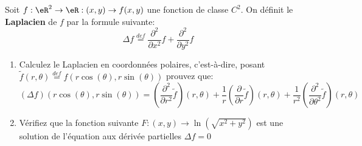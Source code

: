 
\begin{exercice}\label{exo0061}

Soit $f:\eR^2 \rightarrow \eR: (x, y) \rightarrow f(x,y)$ une
fonction de classe $C^2$. On définit le {\bf Laplacien} de $f$ par la
formule suivante:
\[
\Delta f \stackrel{def}= \frac{\partial ^2}{\partial x^2 } f +
\frac{\partial^2}{\partial y^2} f
\]
\begin{enumerate}
\item
Calculez le Laplacien en coordonnées polaires, c'est-\`a-dire, posant
$\tilde{f} (r, \theta) \stackrel{def}= f(r\cos(\theta),r\sin(\theta))$
prouvez que:
\[
(\Delta f)(r\cos(\theta), r\sin(\theta))
= (\frac{\partial^2}{\partial r^2}\tilde{f})(r, \theta)
+ \frac{1}{r} (\frac{\partial}{\partial r}\tilde{f})(r,\theta)
+ \frac{1}{r^2} (\frac{\partial^2}{\partial \theta^2}\tilde{f})(r,\theta)
\]
\item
Vérifiez que la fonction suivante $F:( x,y) \rightarrow \ln(\sqrt{x^2+y^2})
$ est une solution de l'équation aux dérivée partielles $\Delta f =0$
\end{enumerate}
 
\end{exercice}
